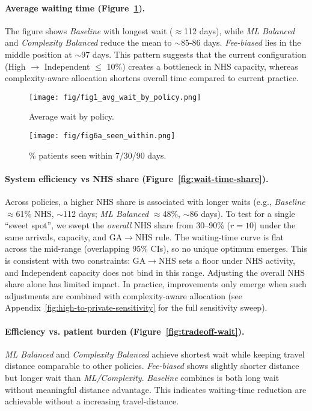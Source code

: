 \documentclass[ %
                    author={Nattanan Nawakitbamrung},
                supervisor={Dr. Sébastien Rochat},
                    degree={MSc},
                     title={Developing and Evaluating the Impact of a Single Patient Treatment List (PTL) for an NHS Integrated Care System},
                  subtitle={},
                      type={},
                      year={2025}]{dissertation}
\begin{document}
\paragraph{Average waiting time (Figure~\ref{fig:avg-wait}).}
The figure shows \textit{Baseline} with longest wait ($\approx$112 days), while \textit{ML Balanced} and \textit{Complexity Balanced} reduce the mean to $\sim$85-86 days. \textit{Fee-biased} lies in the middle position at $\sim$97 days. This pattern suggests that the current configuration (High $\rightarrow$ Independent $\leq$ 10\%) creates a bottleneck in NHS capacity, whereas complexity-aware allocation shortens overall time compared to current practice.

\begin{figure}[htbp]
\centering
\texttt{[image: fig/fig1\_avg\_wait\_by\_policy.png]}
\caption{Average wait by policy.}
\label{fig:avg-wait}
\end{figure}

\clearpage
\begin{figure}[htbp]
\centering
\texttt{[image: fig/fig6a\_seen\_within.png]}
\caption{\% patients seen within 7/30/90 days.}
\label{fig:pct-see}
\end{figure}

\paragraph{System efficiency vs NHS share (Figure~\ref{fig:wait-time-share}).}
Across policies, a higher NHS share is associated with longer waits (e.g., \textit{Baseline} $\approx$61\% NHS, $\sim$112 days; \textit{ML Balanced} $\approx$48\%, $\sim$86 days). To test for a single “sweet spot”, we swept the \emph{overall} NHS share from 30–90\% ($r=10$) under the same arrivals, capacity, and GA$\rightarrow$NHS rule. The waiting-time curve is flat across the mid-range (overlapping 95\% CIs), so no unique optimum emerges. This is consistent with two constraints: GA$\rightarrow$NHS sets a floor under NHS activity, and Independent capacity does not bind in this range. Adjusting the overall NHS share alone has limited impact. In practice, improvements only emerge when such adjustments are combined with complexity-aware allocation (see Appendix~\ref{fig:high-to-private-sensitivity} for the full sensitivity sweep).

\paragraph{Efficiency vs. patient burden (Figure~\ref{fig:tradeoff-wait}).} 
\textit{ML Balanced} and \textit{Complexity Balanced} achieve shortest wait while keeping travel distance comparable to other policies. \textit{Fee-biased} shows slightly shorter distance but longer wait than \textit{ML/Complexity}. \textit{Baseline} combines is both long wait without meaningful distance advantage. This indicates waiting-time reduction are achievable without a increasing travel-distance.
\end{document}
